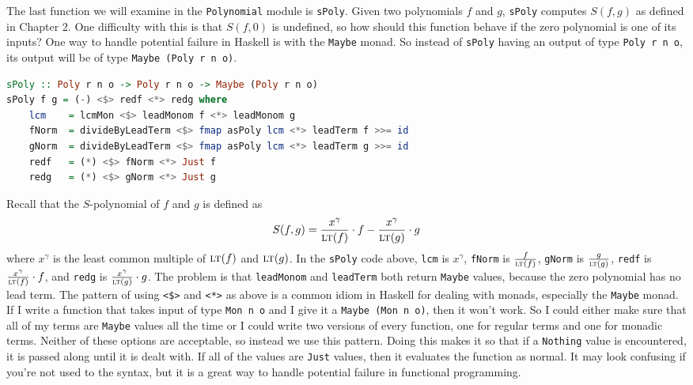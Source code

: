 \documentclass[MS, xcolor=dvipsnames]{wfuthesis}
\newcommand{\LT}{\ensuremath{\text{\sc lt}}}
\theoremstyle{definition}
\begin{document}
The last function we will examine in the \lstinline{Polynomial} module is \lstinline{sPoly}. Given two polynomials $f$ and $g$, \lstinline{sPoly} computes $S(f,g)$ as defined in Chapter 2. One difficulty with this is that $S(f,0)$ is undefined, so how should this function behave if the zero polynomial is one of its inputs? One way to handle potential failure in Haskell is with the \lstinline{Maybe} monad. So instead of \lstinline{sPoly} having an output of type \lstinline{Poly r n o}, its output will be of type \lstinline{Maybe (Poly r n o)}.
\begin{lstlisting}[language=Haskell]
sPoly :: Poly r n o -> Poly r n o -> Maybe (Poly r n o)
sPoly f g = (-) <$> redf <*> redg where
    lcm    = lcmMon <$> leadMonom f <*> leadMonom g
    fNorm  = divideByLeadTerm <$> fmap asPoly lcm <*> leadTerm f >>= id
    gNorm  = divideByLeadTerm <$> fmap asPoly lcm <*> leadTerm g >>= id
    redf   = (*) <$> fNorm <*> Just f
    redg   = (*) <$> gNorm <*> Just g
\end{lstlisting}
Recall that the $S$-polynomial of $f$ and $g$ is defined as
\[ S(f,g) = \frac{x^\gamma}{\LT(f)} \cdot f - \frac{x^\gamma}{\LT(g)} \cdot g \]
where $x^\gamma$ is the least common multiple of $\LT(f)$ and $\LT(g)$. In the \lstinline{sPoly} code above, \lstinline{lcm} is $x^\gamma$, \lstinline{fNorm} is $\frac{f}{\LT(f)}$, \lstinline{gNorm} is $\frac{g}{\LT(g)}$, \lstinline{redf} is $\frac{x^\gamma}{\LT(f)} \cdot f$, and \lstinline{redg} is $\frac{x^\gamma}{\LT(g)} \cdot g$. The problem is that \lstinline{leadMonom} and \lstinline{leadTerm} both return \lstinline{Maybe} values, because the zero polynomial has no lead term. The pattern of using \lstinline{<$>} and \lstinline{<*>} as above is a common idiom in Haskell for dealing with monads, especially the \lstinline{Maybe} monad. If I write a function that takes input of type \lstinline{Mon n o} and I give it a \lstinline{Maybe (Mon n o)}, then it won't work. So I could either make sure that all of my terms are \lstinline{Maybe} values all the time or I could write two versions of every function, one for regular terms and one for monadic terms. Neither of these options are acceptable, so instead we use this pattern. Doing this makes it so that if a \lstinline{Nothing} value is encountered, it is passed along until it is dealt with. If all of the values are \lstinline{Just} values, then it evaluates the function as normal. It may look confusing if you're not used to the syntax, but it is a great way to handle potential failure in functional programming. \par
\end{document}
